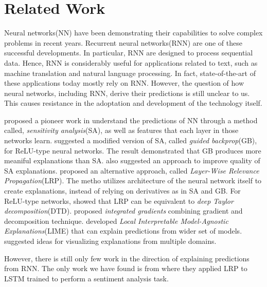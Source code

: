 \chapter{Related Work}
\label{cha:chapter2}

Neural networks(NN) have been demonstrating their capabilities to solve complex problems in recent years. Recurrent neural networks(RNN) are one of these successful developments. In particular, RNN are designed to process sequential data. Hence, RNN is considerably useful for applications related to text, such as machine translation and natural language processing. In fact, state-of-the-art of these applications today mostly rely on RNN. However, the question of how neural networks, including RNN, derive their predictions is still unclear to us. This causes resistance in the adoptation and development of the technology itself. 

\cite{SimonyanDeepConvolutionalNetworks2013}  proposed a pioneer work in understand the predictions of NN through a method called, \textit{sensitivity analysis}(SA), as well as features that each layer in those networks learn. \cite{SpringenbergStrivingSimplicityAll2014e} suggested a modified version of SA, called \textit{guided backprop}(GB), for ReLU-type neural networks. The result demonstrated that GB produces more meaniful explanations than SA. \cite{SmilkovSmoothGradremovingnoise2017} also suggested an approach to improve quality of SA explanations. \cite{BachPixelWiseExplanationsNonLinear2015} proposed an alternative approach, called \textit{Layer-Wise Relevance Propagation}(LRP). The metho utilizes architecture of the neural network itself to create explanations, instead of relying on derivatives as in SA and GB. For ReLU-type networks,\cite{MontavonExplainingnonlinearclassification2017} showed that LRP can be equivalent to \textit{deep Taylor decomposition}(DTD). \cite{SundararajanAxiomaticAttributionDeep2017} proposed \textit{integrated gradients} combining gradient and decomposition technique. \cite{RibeiroWhyShouldTrust2016} developed \textit{Local Interpretable Model-Agnostic Explanations}(LIME) that can explain predictions from wider set of models. \cite{OlahBuildingBlocksInterpretability2018} suggested ideas for visualizing explanations from multiple domains. 

However, there is still only few work in the direction of explaining predictions from RNN. The only work we have found is from \cite{ArrasExplainingRecurrentNeural2017} where they applied LRP to  LSTM\cite{HochreiterLongshorttermmemory1997} trained to perform a sentiment analysis task.